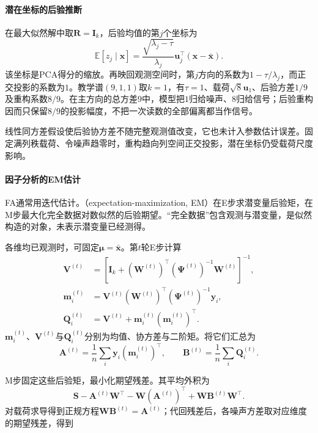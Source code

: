\paragraph{潜在坐标的后验推断}


在最大似然解中取$\bm{R}=\bm{I}_k$，后验均值的第$j$个坐标为
\begin{equation}
\label{eq:dim-ppca-score}
\mathbb{E}[z_j\mid\bm{x}]
=\frac{\sqrt{\lambda_j-\tau}}{\lambda_j}
\bm{u}_j^\top(\bm{x}-\bar{\bm{x}}).
\end{equation}
该坐标是PCA得分的缩放。再映回观测空间时，第$j$方向的系数为$1-\tau/\lambda_j$，而正交投影的系数为$1$。教学谱$(9,1,1)$取$k=1$，有$\tau=1$、载荷$\sqrt8\bm{u}_1$、后验方差$1/9$及重构系数$8/9$。在主方向的总方差$9$中，模型把$1$归给噪声、$8$归给信号；后验重构因而只保留$8/9$的投影幅度，不把一次读数的全部偏离都当作信号。

线性同方差假设使后验协方差不随完整观测值改变，它也未计入参数估计误差。固定满列秩载荷、令噪声趋零时，重构趋向列空间正交投影，潜在坐标仍受载荷尺度影响。

\paragraph{因子分析的EM估计}

FA通常用迭代估计。（expectation-maximization, EM）在E步求潜变量后验矩，在M步最大化完全数据对数似然的后验期望。“完全数据”包含观测与潜变量，是似然构造的对象，未表示潜变量已经测得。

各维均已观测时，可固定$\bm{\mu}=\bar{\bm{x}}$。第$t$轮E步计算
\begin{equation}
\label{eq:dim-fa-estep}
\begin{aligned}
\bm{V}^{(t)}
&=\left[\bm{I}_k+
(\bm{W}^{(t)})^\top(\bm{\Psi}^{(t)})^{-1}
\bm{W}^{(t)}\right]^{-1},\\
\bm{m}_i^{(t)}
&=\bm{V}^{(t)}(\bm{W}^{(t)})^\top
(\bm{\Psi}^{(t)})^{-1}\bm{y}_i,\\
\bm{Q}_i^{(t)}
&=\bm{V}^{(t)}+\bm{m}_i^{(t)}(\bm{m}_i^{(t)})^\top.
\end{aligned}
\end{equation}
$\bm{m}_i^{(t)}$、$\bm{V}^{(t)}$与$\bm{Q}_i^{(t)}$分别为均值、协方差与二阶矩。将它们汇总为
\[
\bm{A}^{(t)}=\frac1n\sum_i\bm{y}_i(\bm{m}_i^{(t)})^\top,
\qquad
\bm{B}^{(t)}=\frac1n\sum_i\bm{Q}_i^{(t)}.
\]

M步固定这些后验矩，最小化期望残差。其平均外积为
\[
 \bm S-\bm A^{(t)}\bm W^\top-\bm W(\bm A^{(t)})^\top
       +\bm W\bm B^{(t)}\bm W^\top.
\]
对载荷求导得到正规方程$\bm W\bm B^{(t)}=\bm A^{(t)}$；代回残差后，各噪声方差取对应维度的期望残差，得到

